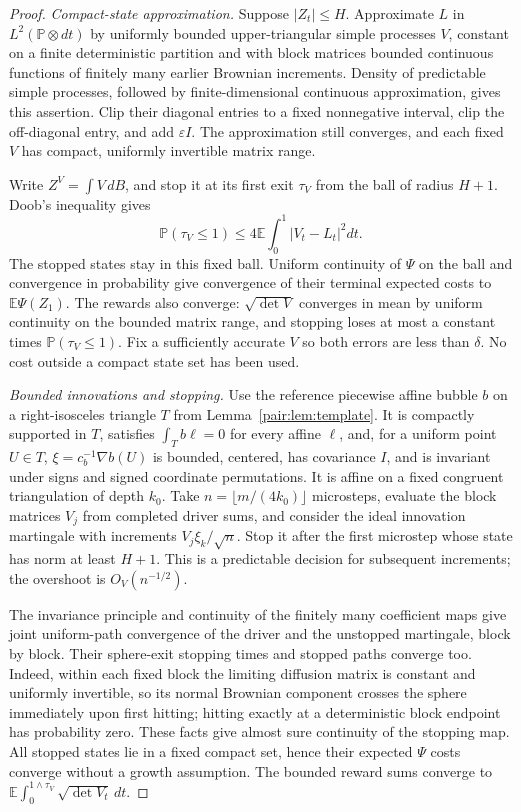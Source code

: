 \documentclass[11pt]{article}
\newcommand{\E}{\mathbb E}
\newcommand{\PP}{\mathbb P}
\numberwithin{equation}{section}
\begin{document}
\begin{proof}
\emph{Compact-state approximation.}
Suppose \(|Z_t|\le H\).  Approximate \(L\) in
\(L^2(\PP\otimes dt)\) by uniformly bounded upper-triangular simple
processes \(V\), constant on a finite deterministic partition and
with block matrices bounded continuous functions of finitely many
earlier Brownian increments.  Density of predictable simple processes,
followed by finite-dimensional continuous approximation, gives this
assertion.  Clip their diagonal entries to a fixed nonnegative interval,
clip the off-diagonal entry, and add \(\varepsilon I\).  The approximation
still converges, and each fixed \(V\) has compact, uniformly invertible
matrix range.

Write \(Z^V=\int V\,dB\), and stop it at its first exit \(\tau_V\)
from the ball of radius \(H+1\).  Doob's inequality gives
\[
 \PP(\tau_V\le1)\le4\E\int_0^1|V_t-L_t|^2dt.
\]
The stopped states stay in this fixed ball.  Uniform continuity of
\(\Psi\) on the ball and convergence in probability give convergence
of their terminal expected costs to \(\E\Psi(Z_1)\).  The rewards
also converge: \(\sqrt{\det V}\) converges in mean by uniform
continuity on the bounded matrix range, and stopping loses at most a
constant times \(\PP(\tau_V\le1)\).  Fix a sufficiently accurate
\(V\) so both errors are less than \(\delta\).  No cost outside a
compact state set has been used.

\emph{Bounded innovations and stopping.}
Use the reference piecewise affine bubble \(b\) on a right-isosceles
triangle \(T\) from Lemma~\ref{pair:lem:template}.  It is compactly supported in
\(T\), satisfies \(\int_Tb\ell=0\) for every affine \(\ell\), and,
for a uniform point \(U\in T\),
\(\xi=c_b^{-1}\nabla b(U)\) is bounded, centered, has covariance
\(I\), and is invariant under signs and signed coordinate permutations.
It is affine on a fixed congruent triangulation of depth \(k_0\).
Take \(n=\lfloor m/(4k_0)\rfloor\) microsteps, evaluate the block
matrices \(V_j\) from completed driver sums, and consider the ideal
innovation martingale with increments \(V_j\xi_k/\sqrt n\).
Stop it after the first microstep whose state has norm at least
\(H+1\).  This is a predictable decision for subsequent increments;
the overshoot is \(O_V(n^{-1/2})\).

The invariance principle and continuity of the finitely many coefficient
maps give joint uniform-path convergence of the driver and the
unstopped martingale, block by block.  Their sphere-exit stopping
times and stopped paths converge too.  Indeed, within each fixed block
the limiting diffusion matrix is constant and uniformly invertible,
so its normal Brownian component crosses the sphere immediately upon
first hitting; hitting exactly at a deterministic block endpoint has
probability zero.  These facts give almost sure continuity of the
stopping map.  All stopped states lie in a fixed compact set, hence
their expected \(\Psi\) costs converge without a growth assumption.
The bounded reward sums converge to
\(\E\int_0^{1\wedge\tau_V}\sqrt{\det V_t}\,dt\).


\end{proof}
\end{document}
